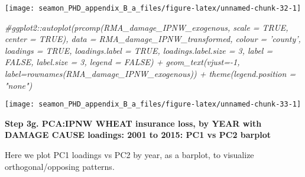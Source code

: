 \documentclass[]{article}
\newenvironment{Shaded}{\begin{snugshade}}{\end{snugshade}}
\newcommand{\CommentTok}[1]{\textcolor[rgb]{0.56,0.35,0.01}{\textit{#1}}}
\newcommand{\DataTypeTok}[1]{\textcolor[rgb]{0.13,0.29,0.53}{#1}}
\newcommand{\DecValTok}[1]{\textcolor[rgb]{0.00,0.00,0.81}{#1}}
\newcommand{\KeywordTok}[1]{\textcolor[rgb]{0.13,0.29,0.53}{\textbf{#1}}}
\newcommand{\NormalTok}[1]{#1}
\newcommand{\OperatorTok}[1]{\textcolor[rgb]{0.81,0.36,0.00}{\textbf{#1}}}
\newcommand{\StringTok}[1]{\textcolor[rgb]{0.31,0.60,0.02}{#1}}
\begin{document}
\texttt{[image: seamon\_PHD\_appendix\_B\_a\_files/figure-latex/unnamed-chunk-32-1]}

\begin{Shaded}
\begin{Highlighting}[]
\CommentTok{#ggplot2::autoplot(prcomp(RMA_damage_IPNW_exogenous, scale = TRUE, center = TRUE), data = RMA_damage_IPNW_transformed, colour = 'county', loadings = TRUE, loadings.label = TRUE, loadings.label.size  = 3, label = FALSE, label.size = 3, legend = FALSE) + geom_text(vjust=-1, label=rownames(RMA_damage_IPNW_exogenous)) + theme(legend.position = "none")}
\end{Highlighting}
\end{Shaded}

\begin{Shaded}
\end{Shaded}

\texttt{[image: seamon\_PHD\_appendix\_B\_a\_files/figure-latex/unnamed-chunk-33-1]}

\textbf{Step 3g. PCA:IPNW WHEAT insurance loss, by YEAR with DAMAGE
CAUSE loadings: 2001 to 2015: PC1 vs PC2 barplot}

Here we plot PC1 loadings vs PC2 by year, as a barplot, to visualize
orthogonal/opposing patterns.
\end{document}
